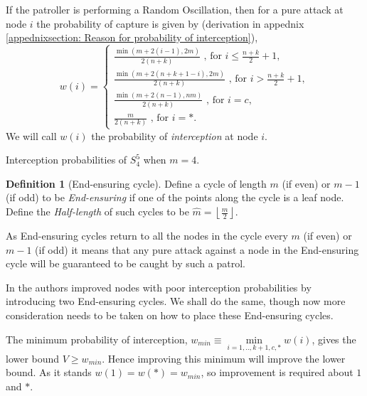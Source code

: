 \documentclass[a4paper,10pt]{article}
\newcommand{\floor}[1]{\left \lfloor #1 \right \rfloor}
\theoremstyle{definition}
\newtheorem{definition}[theorem]{Definition}
\theoremstyle{definition}
\theoremstyle{remark}
\theoremstyle{definition}
\begin{document}
If the patroller is performing a Random Oscillation, then for a pure attack at node $i$ the probability of capture is given by (derivation in appednix \ref{appednixsection: Reason for probability of interception}),
\begin{equation}
\label{eq:Prob of Interception}
w(i)= \left\{\begin{array}{l}
 \frac{\min(m+2(i-1),2m)}{2(n+k)} \text{  , for } i \leq \frac{n+k}{2} +1, \\
 \frac{\min(m+2(n+k+1-i),2m)}{2(n+k)} \text{  , for } i > \frac{n+k}{2} +1, \\
 \frac{\min(m+2(n-1),nm)}{2(n+k)} \text{  , for } i=c, \\
 \frac{m}{2(n+k)} \text{  , for } i=*. 
\end{array} \right.
\end{equation}
We will call $w(i)$ the probability of \textit{interception} at node $i$.


\begin{examplefigure}
\begin{center}

\end{center}
\caption{Interception probabilities of $S^5_{4}$ when $m=4$.}
\end{examplefigure}


\begin{definition}[End-ensuring cycle]
Define a cycle of length $m$ (if even) or $m-1$ (if odd) to be \textit{End-ensuring} if one of the points along the cycle is a leaf node. Define the \textit{Half-length} of such cycles to be $\hat{m}=\floor{\frac{m}{2}}$.
\end{definition}

As End-ensuring cycles return to all the nodes in the cycle every $m$ (if even) or $m-1$ (if odd) it means that any pure attack against a node in the End-ensuring cycle will be guaranteed to be caught by such a patrol.

In \cite{Papadaki2016} the authors improved nodes with poor interception probabilities by introducing two End-ensuring cycles. We shall do the same, though now more consideration needs to be taken on how to place these End-ensuring cycles. 

The minimum probability of interception, $w_{min} \equiv \min\limits_{i=1,..,k+1,c,*} w(i)$, gives the lower bound $V \geq w_{min}$. Hence improving this minimum will improve the lower bound. As it stands $w(1)=w(*)=w_{min}$, so improvement is required about $1$ and $*$.
\end{document}
